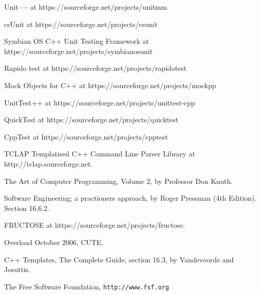 \documentclass{book}
\begin{document}
 
\begin{thebibliography}{10} 
Unit---- at https://sourceforge.net/projects/unitmm

csUnit at https://sourceforge.net/projects/csunit

Symbian OS C++ Unit Testing Framework at https://sourceforge.net/projects/symbianosunit

Rapido test at https://sourceforge.net/projects/rapidotest

Mock Objects for C++ at https://sourceforge.net/projects/mockpp

UnitTest++ at https://sourceforge.net/projects/unittest-cpp


QuickTest at https://sourceforge.net/projects/quicktest

CppTest at https://sourceforge.net/projects/cpptest

TCLAP Templatised C++ Command Line Parser Library
at http://tclap.sourceforge.net.

The Art of Computer Programming, Volume 2,
by Professor Don Knuth.

Software Engineering; a practioners approach,
by Roger Pressman (4th Edition). Section 16.6.2.

FRUCTOSE at https://sourceforge.net/projects/fructose.

Overload October 2006, CUTE.

C++ Templates, The Complete Guide, section 16.3,
by Vandevoorde and Josuttis.

The Free Software Foundation, {\tt http://www.fsf.org}
\end{thebibliography} 
\end{document}
